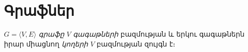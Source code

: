 

%
%
\chapter{Գրաֆներ}

\(G=\langle V, E\rangle\) \emph{գրաֆը} \(V\) \emph{գագաթների} բազմության և երկու գագաթներն իրար միացնող \emph{կողերի} \(V\) բազմության զույգն է։ 


